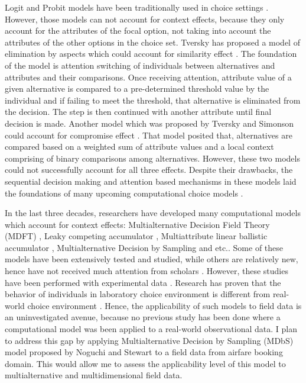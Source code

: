 \documentclass[a4paper,12pt]{article}
\newcommand{\citeyearonly}[1]{\citeyearpar{#1}}
\begin{document}
Logit and Probit models have been traditionally used in choice settings \citep{gensch1979multinomial, kim2017probit}. However, those models can not account for context effects, because they only account for the attributes of the focal option, not taking into account the attributes of the other options in the choice set. Tversky has proposed a model of elimination by aspects which could account for similarity effect \citeyearonly{tversky1972elimination}. The foundation of the model is attention switching of individuals between alternatives and attributes and their comparisons. Once receiving attention, attribute value of a given alternative is compared to a pre-determined threshold value by the individual and if failing to meet the threshold, that alternative is eliminated from the decision. The step is then  continued with another attribute until final decision is made. Another model which was proposed by Tversky and Simonson could account for compromise effect \citeyearonly{tverskySimonson93}. That model posited that, alternatives are compared based on a weighted sum of attribute values and a local context comprising of binary comparisons among alternatives. However, these two models could not successfully account for all three effects. Despite their drawbacks, the sequential decision making and attention based mechanisms in these models laid the foundations of many upcoming computational choice models \citep{bhatia2013associations}. 

In the last three decades, researchers have developed many computational models which account for context effects: Multialternative Decision Field Theory (MDFT) \citep{roe2001multialternative}, Leaky competing
accumulator \citep{usher2001time}, Multiattribute linear ballistic accumulator \citep{trueblood2014multiattribute}, Multialternative Decision by Sampling  \citep{noguchi2018multialternative} and etc.. Some of these models have been extensively tested and studied, while others are relatively new, hence have not received much attention from scholars \citep{truebloodEtAl13}. However, these studies have been performed with experimental data \citep{evans2019response, berkowitsch2014rigorously, trueblood2014multiattribute, busemeyer2019cognitive}. Research has proven that the behavior of individuals in laboratory choice environment is different from real-world choice environment \citep{hogarth1989risk}. Hence, the applicability of such models to field data is an uninvestigated avenue, because no previous study has been done where a computational model was been applied to a real-world observational data. I plan to address this gap by applying Multialternative Decision by Sampling (MDbS) model proposed by Noguchi and Stewart \citeyearonly{noguchi2018multialternative} to a field data from airfare booking domain. This would allow me to assess the applicability level of this model to multialternative and multidimensional field data. 
\end{document}
